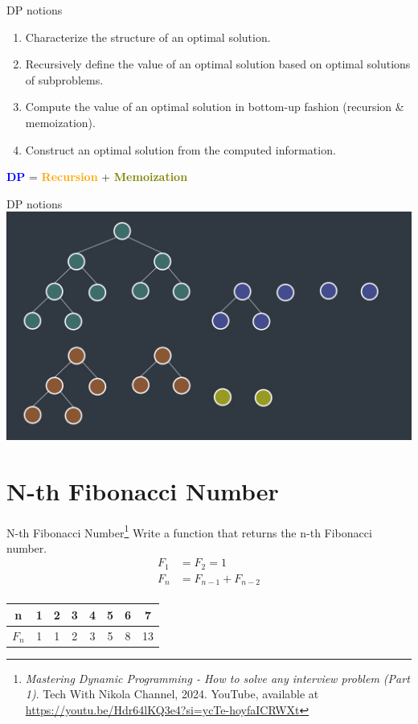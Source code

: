 \documentclass{beamer}
\begin{document}
\begin{frame}{DP notions}
    \begin{enumerate}
        \item Characterize the structure of an optimal solution.
        \item Recursively deﬁne the value of an optimal solution based on optimal solutions of subproblems.
        \item Compute the value of an optimal solution in bottom-up fashion (recursion \& memoization).
        \item Construct an optimal solution from the computed information.
    \end{enumerate}
    \vspace{10mm}
    \centering
    \Large
    \textcolor{blue}{\textbf{DP}} = \textcolor{orange}{\textbf{Recursion}} + \textcolor{olive}{\textbf{Memoization}}
\end{frame}

\begin{frame}{DP notions}
    \centering
    \includegraphics[width=\textwidth]{figures/dp01.png}
\end{frame}

\section{N-th Fibonacci Number}

\begin{frame}{N-th Fibonacci Number\footnote{\scriptsize \textit{Mastering Dynamic Programming - How to solve any interview problem (Part 1)}. Tech With Nikola Channel, 2024. YouTube, available at \url{https://youtu.be/Hdr64lKQ3e4?si=ycTe-hoyfaICRWXt}}}
    Write a function that returns the n-th Fibonacci number.
    \begin{equation*}
        \begin{align*}
            F_1 &= F_2 = 1 \\
            F_n &= F_{n - 1} + F_{n - 2} \\
        \end{align*}
    \end{equation*}
    \centering
    \LARGE
    \begin{tabular}{| c | c | c | c | c | c | c | c |} \hline
        n & 1 & 2 & 3 & 4 & 5 & 6 & 7  \\ \hline
    $F_n$ & 1 & 1 & 2 & 3 & 5 & 8 & 13 \\ \hline
    \end{tabular}
\end{frame}
\end{document}
